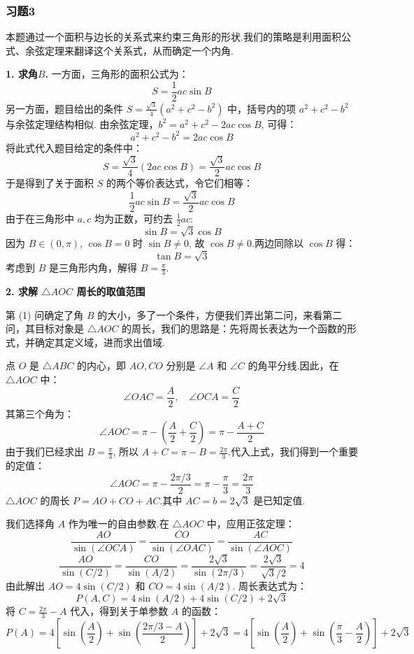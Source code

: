 \subsubsection{习题3}
\begin{solution}
	本题通过一个面积与边长的关系式来约束三角形的形状.我们的策略是利用面积公式、余弦定理来翻译这个关系式，从而确定一个内角.
	
	\textbf{1. 求角$B$.}
	一方面，三角形的面积公式为：
	\[
	S = \frac{1}{2}ac\sin B
	\]
	另一方面，题目给出的条件 $S = \frac{\sqrt{3}}{4}(a^2+c^2-b^2)$ 中，括号内的项 $a^2+c^2-b^2$ 与余弦定理结构相似.
	由余弦定理，$b^2 = a^2+c^2 - 2ac\cos B$, 可得：
	\[
	a^2+c^2-b^2 = 2ac\cos B
	\]
	将此式代入题目给定的条件中：
	\[
	S = \frac{\sqrt{3}}{4}(2ac\cos B) = \frac{\sqrt{3}}{2}ac\cos B
	\]
	于是得到了关于面积 $S$ 的两个等价表达式，令它们相等：
	\[
	\frac{1}{2}ac\sin B = \frac{\sqrt{3}}{2}ac\cos B
	\]
	由于在三角形中 $a, c$ 均为正数，可约去 $\frac{1}{2}ac$:
	\[
	\sin B = \sqrt{3}\cos B
	\]
	因为 $B \in (0, \pi)$, $\cos B=0$ 时 $\sin B \neq 0$, 故 $\cos B \neq 0$.两边同除以 $\cos B$ 得：
	\[
	\tan B = \sqrt{3}
	\]
	考虑到 $B$ 是三角形内角，解得 $B = \frac{\pi}{3}$.
	
	\textbf{2. 求解 $\triangle AOC$ 周长的取值范围}
	
	第 (1) 问确定了角 $B$ 的大小，多了一个条件，方便我们弄出第二问，来看第二问，其目标对象是 $\triangle AOC$ 的周长，我们的思路是：先将周长表达为一个函数的形式，并确定其定义域，进而求出值域.
	
	点 $O$ 是 $\triangle ABC$ 的内心，即 $AO, CO$ 分别是 $\angle A$ 和 $\angle C$ 的角平分线.因此，在 $\triangle AOC$ 中：
	\[
	\angle OAC = \frac{A}{2}, \quad \angle OCA = \frac{C}{2}
	\]
	其第三个角为：
	\[
	\angle AOC = \pi - \left(\frac{A}{2} + \frac{C}{2}\right) = \pi - \frac{A+C}{2}
	\]
	由于我们已经求出 $B=\frac{\pi}{3}$, 所以 $A+C = \pi - B = \frac{2\pi}{3}$.代入上式，我们得到一个重要的定值：
	\[
	\angle AOC = \pi - \frac{2\pi/3}{2} = \pi - \frac{\pi}{3} = \frac{2\pi}{3}
	\]
	$\triangle AOC$ 的周长 $P = AO + CO + AC$.其中 $AC = b = 2\sqrt{3}$ 是已知定值.
	
	我们选择角 $A$ 作为唯一的自由参数.在 $\triangle AOC$ 中，应用正弦定理：
	\[
	\frac{AO}{\sin(\angle OCA)} = \frac{CO}{\sin(\angle OAC)} = \frac{AC}{\sin(\angle AOC)}
	\]
	\[
	\frac{AO}{\sin(C/2)} = \frac{CO}{\sin(A/2)} = \frac{2\sqrt{3}}{\sin(2\pi/3)} = \frac{2\sqrt{3}}{\sqrt{3}/2} = 4
	\]
	由此解出 $AO = 4\sin(C/2)$ 和 $CO = 4\sin(A/2)$.
	周长表达式为：
	\[
	P(A,C) = 4\sin(A/2) + 4\sin(C/2) + 2\sqrt{3}
	\]
	将 $C = \frac{2\pi}{3}-A$ 代入，得到关于单参数 $A$ 的函数：
	\[
	P(A) = 4\left[\sin\left(\frac{A}{2}\right) + \sin\left(\frac{2\pi/3-A}{2}\right)\right] + 2\sqrt{3} = 4\left[\sin\left(\frac{A}{2}\right) + \sin\left(\frac{\pi}{3}-\frac{A}{2}\right)\right] + 2\sqrt{3}
	\]
	

\end{solution}
